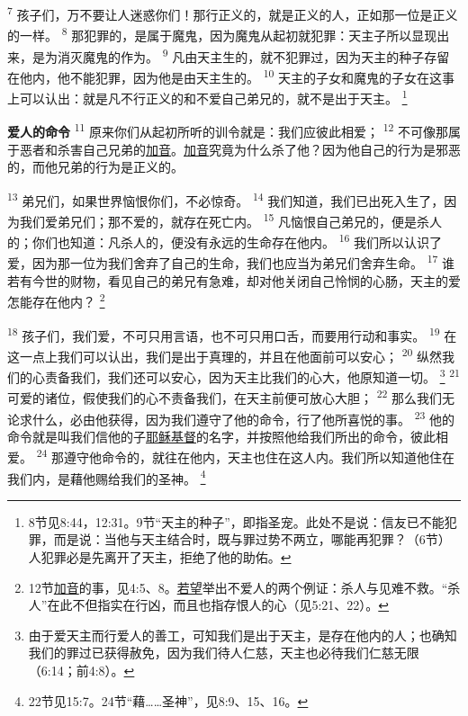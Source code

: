 \textsuperscript{7}
孩子们，万不要让人迷惑你们！那行正义的，就是正义的人，正如那一位是正义的一样。
\textsuperscript{8}
那犯罪的，是属于魔鬼，因为魔鬼从起初就犯罪：天主子所以显现出来，是为消灭魔鬼的作为。
\textsuperscript{9}
凡由天主生的，就不犯罪过，因为天主的种子存留在他内，他不能犯罪，因为他是由天主生的。
\textsuperscript{10}
天主的子女和魔鬼的子女在这事上可以认出：就是凡不行正义的和不爱自己弟兄的，就不是出于天主。
\footnote{8节见8:44，12:31。9节“天主的种子”，即指圣宠。此处不是说：信友已不能犯罪，而是说：当他与天主结合时，既与罪过势不两立，哪能再犯罪？（6节）人犯罪必是先离开了天主，拒绝了他的助佑。}

\textbf{爱人的命令\quad}
\textsuperscript{11}
原来你们从起初所听的训令就是：我们应彼此相爱；
\textsuperscript{12}
不可像那属于恶者和杀害自己兄弟的\uline{加音}。\uline{加音}究竟为什么杀了他？因为他自己的行为是邪恶的，而他兄弟的行为是正义的。

\textsuperscript{13}
弟兄们，如果世界恼恨你们，不必惊奇。
\textsuperscript{14}
我们知道，我们已出死入生了，因为我们爱弟兄们；那不爱的，就存在死亡内。
\textsuperscript{15}
凡恼恨自己弟兄的，便是杀人的；你们也知道：凡杀人的，便没有永远的生命存在他内。
\textsuperscript{16}
我们所以认识了爱，因为那一位为我们舍弃了自己的生命，我们也应当为弟兄们舍弃生命。
\textsuperscript{17}
谁若有今世的财物，看见自己的弟兄有急难，却对他关闭自己怜悯的心肠，天主的爱怎能存在他内？
\footnote{12节\uline{加音}的事，见4:5、8。\uline{若望}举出不爱人的两个例证：杀人与见难不救。“杀人”在此不但指实在行凶，而且也指存恨人的心（见5:21、22）。}

\textsuperscript{18}
孩子们，我们爱，不可只用言语，也不可只用口舌，而要用行动和事实。
\textsuperscript{19}
在这一点上我们可以认出，我们是出于真理的，并且在他面前可以安心；
\textsuperscript{20}
纵然我们的心责备我们，我们还可以安心，因为天主比我们的心大，他原知道一切。
\footnote{由于爱天主而行爱人的善工，可知我们是出于天主，是存在他内的人；也确知我们的罪过已获得赦免，因为我们待人仁慈，天主也必待我们仁慈无限（6:14；前4:8）。}
\textsuperscript{21}
可爱的诸位，假使我们的心不责备我们，在天主前便可放心大胆；
\textsuperscript{22}
那么我们无论求什么，必由他获得，因为我们遵守了他的命令，行了他所喜悦的事。
\textsuperscript{23}
他的命令就是叫我们信他的子\uline{耶稣}\uline{基督}的名字，并按照他给我们所出的命令，彼此相爱。
\textsuperscript{24}
那遵守他命令的，就往在他内，天主也住在这人内。我们所以知道他住在我们内，是藉他赐给我们的圣神。
\footnote{22节见15:7。24节“藉……圣神”，见8:9、15、16。}

